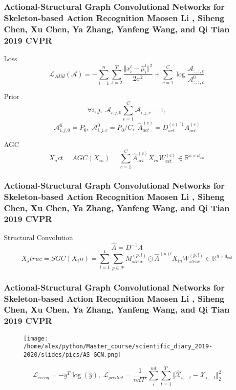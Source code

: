 \documentclass[fleqn, xcolor=x11names]{beamer}
\begin{document}
\begin{frame}\frametitle{\footnotesize{Actional-Structural Graph Convolutional Networks for Skeleton-based Action Recognition 
Maosen Li , Siheng Chen, Xu Chen, Ya Zhang, Yanfeng Wang, and Qi Tian 2019 CVPR 
}}
\begin{block}{Loss}
$$ \mathcal{L}_{AIM}(\mathcal{A}) = -\sum_{i=1}^n\sum_{t=2}^T \frac{\Vert x_i^t - \hat{\mu}_i^t \Vert^2}{2\sigma^2} + \sum \limits_{c=1}^C \log \frac{\mathcal{A}_{:,:,c}}{\mathcal{A}^0_{:,:,c}} $$
\end{block}

\begin{block}{Prior}
$$\forall i,j,\; \mathcal{A}_{i,j,0} \sum \limits_{c=1}^C \mathcal{A}_{i,j,c} = 1,$$
$$ \mathcal{A}_{i,j,0}^0 = P_0,\; \mathcal{A}_{i,j,c}^0=P_0/C,\; \hat{A}_{act}^{(c)} = D_{act}^{(c)^-1} A_{act}^{(c)}$$

\end{block}

\begin{block}{AGC}
$$ X_act = AGC(X_{in}) = \sum_{c=1}^C \hat{A}_{act}^{(c)}X_{in}W_{act}^{(c)} \in \mathbb{R}^{n\times d_{out}}$$
\end{block}

\end{frame}

\begin{frame}\frametitle{\footnotesize{Actional-Structural Graph Convolutional Networks for Skeleton-based Action Recognition 
Maosen Li , Siheng Chen, Xu Chen, Ya Zhang, Yanfeng Wang, and Qi Tian 2019 CVPR 
}}

\begin{block}{Structural Convolution}
$$ \hat{A} = D^{-1}A $$
$$ X_struc = SGC(X_in) = \sum \limits_{l=1}^L \sum \limits_{p \in \mathcal{P}} M_{struc}^{(p,l)} \odot \hat{A}^{(p)l} X_{in}W_{struc}^{(p, l)} \in \mathbb{R}^{n \times d_{out}}$$
\end{block}

\end{frame}

\begin{frame}\frametitle{\footnotesize{Actional-Structural Graph Convolutional Networks for Skeleton-based Action Recognition 
Maosen Li , Siheng Chen, Xu Chen, Ya Zhang, Yanfeng Wang, and Qi Tian 2019 CVPR 
}}
\begin{figure}[h]
\begin{center}
\texttt{[image: /home/alex/python/Master\_course/scientific\_diary\_2019-2020/slides/pics/AS-GCN.png]}
\end{center}
\end{figure}

$$ \mathcal{L}_{recog} = -y^T \log(\hat{y}),\; \mathcal{L}_{predict} = \frac{1}{ndT'} \sum \limits_i^{nd}\sum \limits_{t=1}^{T'} \Vert \hat{\mathcal{X}}_{i,:,t} - \mathcal{X}_{i,:,t} \Vert^2_2$$ 

\end{frame}	
\end{document}
